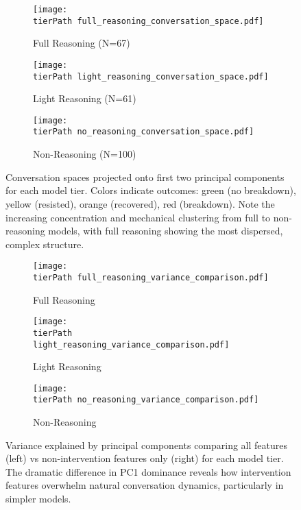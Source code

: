 \documentclass[11pt,letterpaper]{article}
\newcommand{\fullReasoningCount}{67}
\newcommand{\lightReasoningCount}{61}
\newcommand{\nonReasoningCount}{100}
\newcommand{\tierPath}{../analysis/analysis_outputs/tier_analysis/}
\begin{document}
\begin{figure}[htbp]
\centering
\begin{subfigure}[b]{0.32\textwidth}
    \texttt{[image: \\tierPath full\_reasoning\_conversation\_space.pdf]}
    \caption{Full Reasoning (N=\fullReasoningCount{})}
\end{subfigure}
\begin{subfigure}[b]{0.32\textwidth}
    \texttt{[image: \\tierPath light\_reasoning\_conversation\_space.pdf]}
    \caption{Light Reasoning (N=\lightReasoningCount{})}
\end{subfigure}
\begin{subfigure}[b]{0.32\textwidth}
    \texttt{[image: \\tierPath no\_reasoning\_conversation\_space.pdf]}
    \caption{Non-Reasoning (N=\nonReasoningCount{})}
\end{subfigure}
\caption{Conversation spaces projected onto first two principal components for each model tier. Colors indicate outcomes: green (no breakdown), yellow (resisted), orange (recovered), red (breakdown). Note the increasing concentration and mechanical clustering from full to non-reasoning models, with full reasoning showing the most dispersed, complex structure.}
\label{fig:conversation_spaces}
\end{figure}

\begin{figure}[htbp]
\centering
\begin{subfigure}[b]{0.32\textwidth}
    \texttt{[image: \\tierPath full\_reasoning\_variance\_comparison.pdf]}
    \caption{Full Reasoning}
\end{subfigure}
\begin{subfigure}[b]{0.32\textwidth}
    \texttt{[image: \\tierPath light\_reasoning\_variance\_comparison.pdf]}
    \caption{Light Reasoning}
\end{subfigure}
\begin{subfigure}[b]{0.32\textwidth}
    \texttt{[image: \\tierPath no\_reasoning\_variance\_comparison.pdf]}
    \caption{Non-Reasoning}
\end{subfigure}
\caption{Variance explained by principal components comparing all features (left) vs non-intervention features only (right) for each model tier. The dramatic difference in PC1 dominance reveals how intervention features overwhelm natural conversation dynamics, particularly in simpler models.}
\label{fig:variance_structure}
\end{figure}
\end{document}
